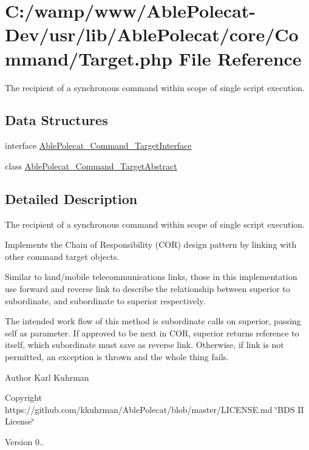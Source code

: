 \hypertarget{_target_8php}{}\section{C\+:/wamp/www/\+Able\+Polecat-\/\+Dev/usr/lib/\+Able\+Polecat/core/\+Command/\+Target.php File Reference}
\label{_target_8php}


The recipient of a synchronous command within scope of single script execution.  


\subsection*{Data Structures}
\begin{DoxyCompactItemize}
\item 
interface \hyperlink{interface_able_polecat___command___target_interface}{Able\+Polecat\+\_\+\+Command\+\_\+\+Target\+Interface}
\item 
class \hyperlink{class_able_polecat___command___target_abstract}{Able\+Polecat\+\_\+\+Command\+\_\+\+Target\+Abstract}
\end{DoxyCompactItemize}


\subsection{Detailed Description}
The recipient of a synchronous command within scope of single script execution. 

Implements the Chain of Responsibility (C\+O\+R) design pattern by linking with other command target objects.

Similar to land/mobile telecommunications links, those in this implementation use forward and reverse link to describe the relationship between superior to subordinate, and subordinate to superior respectively.

The intended work flow of this method is subordinate calls on superior, passing self as parameter. If approved to be next in C\+O\+R, superior returns reference to itself, which subordinate must save as reverse link. Otherwise, if link is not permitted, an exception is thrown and the whole thing fails.

\begin{DoxyAuthor}{Author}
Karl Kuhrman 
\end{DoxyAuthor}
\begin{DoxyCopyright}{Copyright}
https\+://github.com/kkuhrman/\+Able\+Polecat/blob/master/\+L\+I\+C\+E\+N\+S\+E.\+md \char`\"{}\+B\+D\+S I\+I License\char`\"{} 
\end{DoxyCopyright}
\begin{DoxyVersion}{Version}
0.. 
\end{DoxyVersion}
